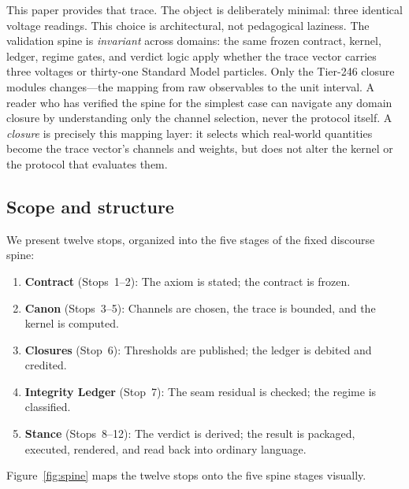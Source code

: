 \documentclass[
  aps,
  prd,
  twocolumn,
  superscriptaddress,
  nofootinbib,
  floatfix
]{revtex4-2}
\begin{document}
This paper provides that trace.  The object is deliberately
minimal: three identical voltage readings.  This choice is
architectural, not pedagogical laziness.  The validation spine is
\emph{invariant} across domains: the same frozen contract, kernel,
ledger, regime gates, and verdict logic apply whether the trace
vector carries three voltages or thirty-one Standard Model
particles.  Only the Tier-246 closure modules changes---the mapping from raw
observables to the unit interval.  A reader who has verified the
spine for the simplest case can navigate any domain closure by
understanding only the channel selection, never the protocol itself.
A \emph{closure} is precisely this mapping layer: it selects which
real-world quantities become the trace vector's channels and weights,
but does not alter the kernel or the protocol that evaluates them.

\subsection{Scope and structure}

We present twelve stops, organized into the five stages of the
fixed discourse spine:
\begin{enumerate}[leftmargin=*]
\item \textbf{Contract} (Stops~1--2): The axiom is stated; the
  contract is frozen.
\item \textbf{Canon} (Stops~3--5): Channels are chosen, the trace
  is bounded, and the kernel is computed.
\item \textbf{Closures} (Stop~6): Thresholds are published; the
  ledger is debited and credited.
\item \textbf{Integrity Ledger} (Stop~7): The seam residual is
  checked; the regime is classified.
\item \textbf{Stance} (Stops~8--12): The verdict is derived;
  the result is packaged, executed, rendered, and read back into
  ordinary language.
\end{enumerate}

Figure~\ref{fig:spine} maps the twelve stops onto the five spine
stages visually.
\end{document}
